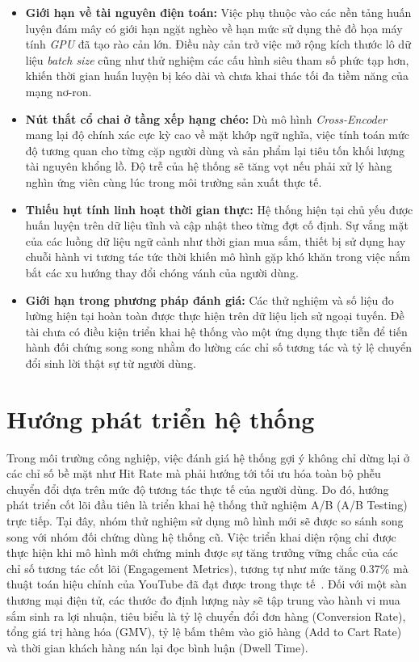 \begin{itemize}
    \item \textbf{Giới hạn về tài nguyên điện toán:} Việc phụ thuộc vào các nền tảng huấn luyện đám mây có giới hạn ngặt nghèo về hạn mức sử dụng thẻ đồ họa máy tính \textit{GPU} đã tạo rào cản lớn. Điều này cản trở việc mở rộng kích thước lô dữ liệu \textit{batch size} cũng như thử nghiệm các cấu hình siêu tham số phức tạp hơn, khiến thời gian huấn luyện bị kéo dài và chưa khai thác tối đa tiềm năng của mạng nơ-ron.
    \item \textbf{Nút thắt cổ chai ở tầng xếp hạng chéo:} Dù mô hình \textit{Cross-Encoder} mang lại độ chính xác cực kỳ cao về mặt khớp ngữ nghĩa, việc tính toán mức độ tương quan cho từng cặp người dùng và sản phẩm lại tiêu tốn khối lượng tài nguyên khổng lồ. Độ trễ của hệ thống sẽ tăng vọt nếu phải xử lý hàng nghìn ứng viên cùng lúc trong môi trường sản xuất thực tế.
    \item \textbf{Thiếu hụt tính linh hoạt thời gian thực:} Hệ thống hiện tại chủ yếu được huấn luyện trên dữ liệu tĩnh và cập nhật theo từng đợt cố định. Sự vắng mặt của các luồng dữ liệu ngữ cảnh như thời gian mua sắm, thiết bị sử dụng hay chuỗi hành vi tương tác tức thời khiến mô hình gặp khó khăn trong việc nắm bắt các xu hướng thay đổi chóng vánh của người dùng.
    \item \textbf{Giới hạn trong phương pháp đánh giá:} Các thử nghiệm và số liệu đo lường hiện tại hoàn toàn được thực hiện trên dữ liệu lịch sử ngoại tuyến. Đề tài chưa có điều kiện triển khai hệ thống vào một ứng dụng thực tiễn để tiến hành đối chứng song song nhằm đo lường các chỉ số tương tác và tỷ lệ chuyển đổi sinh lời thật sự từ người dùng.
\end{itemize}

\section{Hướng phát triển hệ thống}

Trong môi trường công nghiệp, việc đánh giá hệ thống gợi ý không chỉ dừng lại ở các chỉ số bề mặt như Hit Rate mà phải hướng tới tối ưu hóa toàn bộ phễu chuyển đổi dựa trên mức độ tương tác thực tế của người dùng. Do đó, hướng phát triển cốt lõi đầu tiên là triển khai hệ thống thử nghiệm A/B (A/B Testing) trực tiếp. Tại đây, nhóm thử nghiệm sử dụng mô hình mới sẽ được so sánh song song với nhóm đối chứng dùng hệ thống cũ. Việc triển khai diện rộng chỉ được thực hiện khi mô hình mới chứng minh được sự tăng trưởng vững chắc của các chỉ số tương tác cốt lõi (Engagement Metrics), tương tự như mức tăng 0.37\% mà thuật toán hiệu chỉnh của YouTube đã đạt được trong thực tế~\cite{9}. Đối với một sàn thương mại điện tử, các thước đo định lượng này sẽ tập trung vào hành vi mua sắm sinh ra lợi nhuận, tiêu biểu là tỷ lệ chuyển đổi đơn hàng (Conversion Rate), tổng giá trị hàng hóa (GMV), tỷ lệ bấm thêm vào giỏ hàng (Add to Cart Rate) và thời gian khách hàng nán lại đọc bình luận (Dwell Time).

